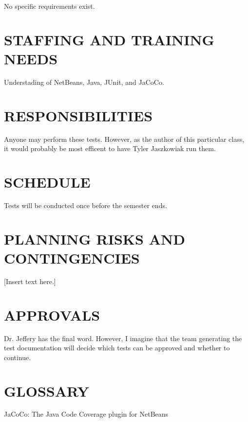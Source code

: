 {\color{black}
No specific requirements exist.}

\section[STAFFING AND TRAINING NEEDS]{\bfseries\color{black}
	 STAFFING AND TRAINING NEEDS}
{\color{black}
Understading of NetBeans, Java, JUnit, and JaCoCo.}

\section[RESPONSIBILITIES]{\bfseries\color{black} RESPONSIBILITIES}
{\color{black}
Anyone may perform these tests. However, as the author of this particular 
class, it would probably be most efficent to have Tyler Jaszkowiak run 
them.}

\section[SCHEDULE]{\bfseries\color{black} SCHEDULE}
{\color{black}
Tests will be conducted once before the semester ends.}

\section[PLANNING RISKS AND CONTINGENCIES]{\bfseries\color{black}
	 PLANNING RISKS AND CONTINGENCIES}
{\color{black}
[Insert text here.]}

\section[APPROVALS]{\bfseries\color{black} APPROVALS}
{\color{black}
Dr. Jeffery has the final word. However, I imagine that the team 
generating the test documentation will decide which tests can be 
approved and whether to continue.}

\section[GLOSSARY]{\bfseries\color{black} GLOSSARY}
{\color{black}
JaCoCo: The Java Code Coverage plugin for NetBeans}

\bigskip
